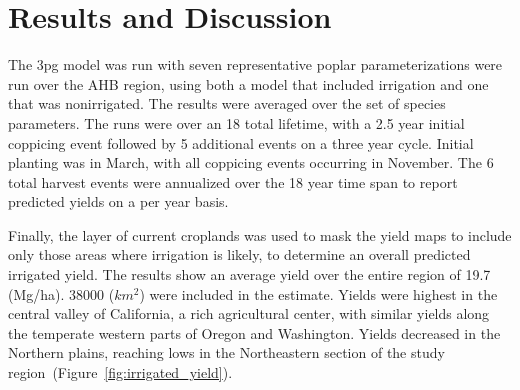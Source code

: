 \documentclass[preprint,12pt]{elsarticle}
\begin{document}
\section{Results and Discussion}

The \ac{3pg} model was run with seven representative poplar
parameterizations were run over the \ac{AHB} region, using both a
model that included irrigation and one that was nonirrigated.  The
results were averaged over the set of species parameters.  The runs
were over an 18 total lifetime, with a 2.5 year initial coppicing
event followed by 5 additional events on a three year cycle.  Initial
planting was in March, with all coppicing events occurring in
November.  The 6 total harvest events were annualized over the 18 year
time span to report predicted yields on a per year basis.

Finally, the layer of current croplands was used to mask the yield
maps to include only those areas where irrigation is likely, to
determine an overall predicted irrigated yield.  The results show an
average yield over the entire region of 19.7 (Mg/ha).  38000 ($km^2$) were
included in the estimate.  Yields were highest in the central valley
of California, a rich agricultural center, with similar yields along
the temperate western parts of Oregon and Washington.  Yields
decreased in the Northern plains, reaching lows in the Northeastern
section of the study region~(Figure~\ref{fig:irrigated_yield}).
\end{document}
